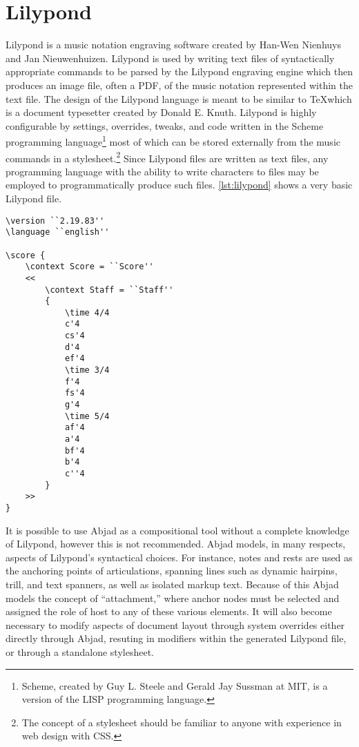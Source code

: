 \section{Lilypond}

Lilypond is a music notation engraving software created by Han-Wen Nienhuys and Jan Nieuwenhuizen. Lilypond is used by writing text files of syntactically appropriate commands to be parsed by the Lilypond engraving engine which then produces an image file, often a \ac{PDF}, of the music notation represented within the text file. The design of the Lilypond language is meant to be similar to \TeX which is a document typesetter created by Donald E. Knuth. Lilypond is highly configurable by settings, overrides, tweaks, and code written in the Scheme programming language\footnote{Scheme, created by Guy L. Steele and Gerald Jay Sussman at MIT, is a version of the LISP programming language.} most of which can be stored externally from the music commands in a stylesheet.\footnote{The concept of a stylesheet should be familiar to anyone with experience in web design with CSS.} Since Lilypond files are written as text files, any programming language with the ability to write characters to files may be employed to programmatically produce such files. \autoref{lst:lilypond} shows a very basic Lilypond file.

\begin{lstlisting}[frame=tb,caption={A simple Lilypond file},label=lst:lilypond]
\version ``2.19.83''
\language ``english''

\score {
    \context Score = ``Score''
    <<
        \context Staff = ``Staff''
        {
            \time 4/4
            c'4
            cs'4
            d'4
            ef'4
            \time 3/4
            f'4
            fs'4
            g'4
            \time 5/4
            af'4
            a'4
            bf'4
            b'4
            c''4
        }
    >>
}
\end{lstlisting}

It is possible to use Abjad as a compositional tool without a complete knowledge of Lilypond, however this is not recommended. Abjad models, in many respects, aspects of Lilypond's syntactical choices. For instance, notes and rests are used as the anchoring points of articulations, spanning lines such as dynamic hairpins, trill, and text spanners, as well as isolated markup text. Because of this Abjad models the concept of ``attachment,'' where anchor nodes must be selected and assigned the role of host to any of these various elements. It will also become necessary to modify aspects of document layout through system overrides either directly through Abjad, resuting in modifiers within the generated Lilypond file, or through a standalone stylesheet.

